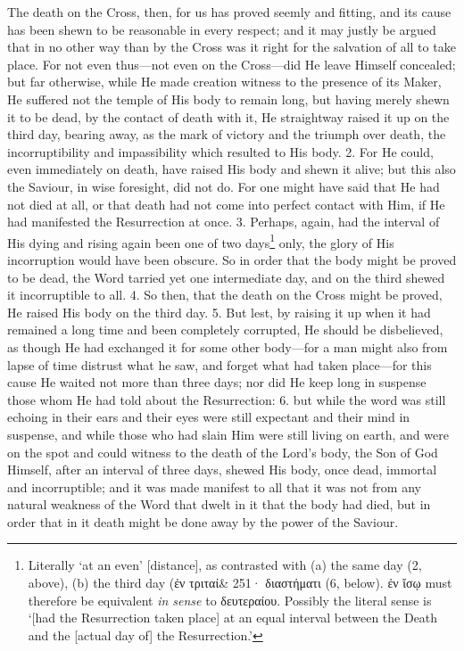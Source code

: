 The death on the Cross, then, for us has proved seemly and fitting, and its cause has been shewn to be reasonable in every respect; and it may justly be argued that in no other way than by the Cross was it right for the salvation of all to take place. For not even thus—not even on the Cross—did He leave Himself concealed; but far otherwise, while He made creation witness to the presence of its Maker, He suffered not the temple of His body to remain long, but having merely shewn it to be dead, by the contact of death with it, He straightway raised it up on the third day, bearing away, as the mark of victory and the triumph over death, the incorruptibility and impassibility which resulted to His body. 2. For He could, even immediately on death, have raised His body and shewn it alive; but this also the Saviour, in wise foresight, did not do. For one might have said that He had not died at all, or that death had not come into perfect contact with Him, if He had manifested the Resurrection at once. 3. Perhaps, again, had the interval of His dying and rising again been one of two days\footnote{Literally ‘at an even’ [distance], as contrasted with (a) the same day (2, above), (b) the third day (\textgreek{ἐν τριταί\& 251· διαστήματι} (6, below). \textgreek{ἐν ἴσῳ} must therefore be equivalent \emph{in sense} to \textgreek{δευτεραίου}. Possibly the literal sense is ‘[had the Resurrection taken place] at an equal interval between the Death and the [actual day of] the Resurrection.’} only, the glory of His incorruption would have been obscure. So in order that the body might be proved to be dead, the Word tarried yet one intermediate day, and on the third shewed it incorruptible to all. 4. So then, that the death on the Cross might be proved, He raised His body on the third day. 5. But lest, by raising it up when it had remained a long time and been completely corrupted, He should be disbelieved, as though He had exchanged it for some other body—for a man might also from lapse of time distrust what he saw, and forget what had taken place—for this cause He waited not more than three days; nor did He keep long in suspense those whom He had told about the Resurrection: 6. but while the word was still echoing in their ears and their eyes were still expectant and their mind in suspense, and while those who had slain Him were still living on earth, and were on the spot and could witness to the death of the Lord’s body, the Son of God Himself, after an interval of three days, shewed His body, once dead, immortal and incorruptible; and it was made manifest to all that it was not from any natural weakness of the Word that dwelt in it that the body had died, but in order that in it death might be done away by the power of the Saviour.

